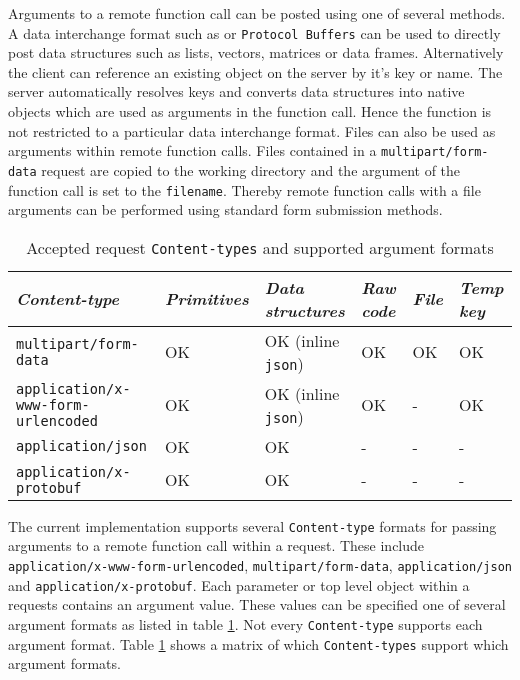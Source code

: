 Arguments to a remote function call can be posted using one of several methods. A data interchange format such as \JSON or \texttt{Protocol Buffers} can be used to directly post data structures such as lists, vectors, matrices or data frames. Alternatively the client can reference an existing object on the server by it's key or name. The server automatically resolves keys and converts data structures into native objects which are used as arguments in the function call. Hence the function is not restricted to a particular data interchange format. Files can also be used as arguments within remote function calls. Files contained in a \texttt{multipart/form-data} request are copied to the working directory and the argument of the function call is set to the \texttt{filename}. Thereby remote function calls with a file arguments can be performed using standard \HTML form submission methods.

\begin{table}[H]
\centering
\def\arraystretch{1.3}%
\begin{tabular}{@{}llllll@{}}
\toprule
\emph{Content-type}                      & \emph{Primitives} & \emph{Data structures}  &  \emph{Raw code} & \emph{File} & \emph{Temp key} \\ \midrule
\texttt{multipart/form-data}               & OK         & OK (inline \texttt{json}) & OK       & OK   & OK            \\
\texttt{application/x-www-form-urlencoded} & OK         & OK (inline \texttt{json}) & OK       & -    & OK            \\
\texttt{application/json}                  & OK         & OK               & -        & -    & -             \\
\texttt{application/x-protobuf}            & OK         & OK               & -        & -    & -             \\ \bottomrule
\end{tabular}
\caption{Accepted request \texttt{Content-types} and supported argument formats}
\label{table:arguments}
\end{table}

The current implementation supports several \texttt{Content-type} formats for passing arguments to a remote function call within a \POST request. These include \texttt{application/x-www-form-urlencoded}, \texttt{multipart/form-data}, \texttt{application/json} and \texttt{application/x-protobuf}. Each parameter or top level object within a \POST requests contains an argument value. These values can be specified one of several argument formats as listed in table \ref{table:arguments}. Not every \texttt{Content-type} supports each argument format. Table \ref{table:arguments} shows a matrix of which \texttt{Content-types} support which argument formats.



